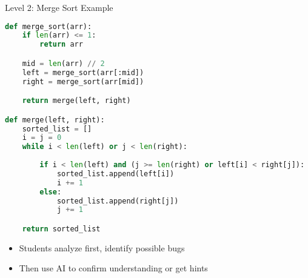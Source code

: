 \documentclass{beamer}
\begin{document}
\begin{frame}[fragile]{Level 2: Merge Sort Example}
    \begin{tcolorbox}[colback=myred!5,colframe=myred,title=Faulty Merge Sort Code]
        \begin{lstlisting}[language=Python, basicstyle=\tiny\ttfamily]
def merge_sort(arr):
    if len(arr) <= 1:
        return arr

    mid = len(arr) // 2
    left = merge_sort(arr[:mid])
    right = merge_sort(arr[mid]) 

    return merge(left, right)

def merge(left, right):
    sorted_list = []
    i = j = 0
    while i < len(left) or j < len(right):
        
        if i < len(left) and (j >= len(right) or left[i] < right[j]):
            sorted_list.append(left[i])
            i += 1
        else:
            sorted_list.append(right[j])
            j += 1

    return sorted_list
        \end{lstlisting}
    \end{tcolorbox}
    
    \begin{itemize}
        \item Students analyze first, identify possible bugs
        \item Then use AI to confirm understanding or get hints
    \end{itemize}
\end{frame}
\end{document}
